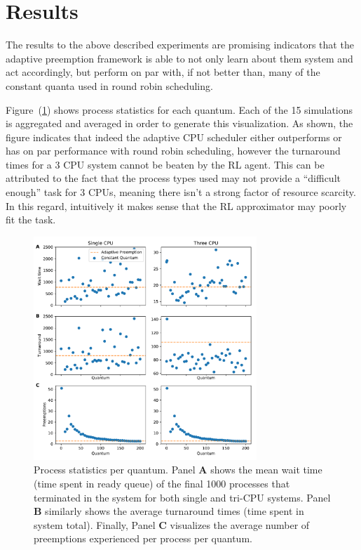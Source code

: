 \documentclass{article}
\begin{document}
\section*{Results}
The results to the above described experiments are promising indicators that the adaptive
preemption framework is able to not only learn about them system and act accordingly,
but perform on par with, if not better than, many of the constant quanta used in
round robin scheduling.\par
Figure~(\ref{fig:params_per_q}) shows process statistics for each quantum. Each of the 15 simulations
is aggregated and averaged in order to generate this visualization. As shown, the figure indicates that
indeed the adaptive CPU scheduler either outperforms or has on par performance with round robin scheduling,
however the turnaround times for a 3 CPU system cannot be beaten by the RL agent. This can be attributed
to the fact that the process types used may not provide a ``difficult enough'' task for 3 CPUs, meaning
there isn't a strong factor of resource scarcity. In this regard, intuitively it makes sense that the
RL approximator may poorly fit the task.
\begin{figure}
    \centering
    \includegraphics[width=0.75\textwidth]{figs/params_per_q.pdf}
    \caption{Process statistics per quantum. Panel \textbf{A} shows the mean wait time (time spent in ready queue) 
             of the final 1000 processes that terminated in the system for both single and tri-CPU systems.
             Panel \textbf{B} similarly shows the average turnaround times (time spent in system total).
             Finally, Panel \textbf{C} visualizes the average number of preemptions experienced per process per quantum.}
    \label{fig:params_per_q}
\end{figure}
\end{document}
